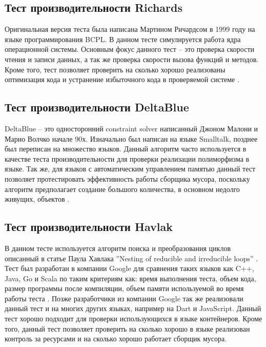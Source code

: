 \subsection{Тест производительности Richards}

Оригинальная версия теста была написана Мартином Ричардсом в 1999 году на языке программирования BCPL. В данном тесте симулируется работа ядра операционной системы.
Основным фокус данного тест -- это проверка скорости чтения и записи данных, а так же проверка скорости вызова функций и методов. Кроме того, тест позволяет проверить на сколько хорошо реализованы оптимизация кода и устранение избыточного кода в проверяемой системе \cite{Richards}.

\subsection{Тест производительности DeltaBlue}

DeltaBlue -- это односторонний constraint solver написанный Джоном Малони и Марио Волчко начале 90х. Изначально был написан на языке Smalltalk, позднее был переписан на множество языков. Данный алгоритм часто используется в качестве теста производительности для проверки реализации полиморфизма в языке. Так же, для языков с автоматическим управлением памятью данный тест позволяет протестировать эффективность работы сборщика мусора, поскольку алгоритм предполагает создание большого количества, в основном недолго живущих, объектов \cite{DeltaBlueST, DeltaBlue, DeltaBlue2}.

\subsection{Тест производительности Havlak}

В данном тесте используется алгоритм поиска и преобразования циклов описанный в статье Паула Хавлака ”Nesting of reducible and irreducible
loops” \cite{Havlak}. Тест был разработан в компании Google для сравнения таких языков как C++, Java, Go и Scala по таким критериям как: время выполнения теста, объем кода, размер программы после компиляции, объем памяти используемой во время работы теста \cite{HavlakBench}. Позже разработчики из компании Google так же реализовали данный тест и на многих других языках, например на Dart и JavaScript. Данный тест хорошо подходит для проверки использующихся в языке контейнеров. Кроме того, данный тест позволяет проверить на сколько хорошо в языке реализован контроль за ресурсами и на сколько хорошо работает сборщик мусора.

